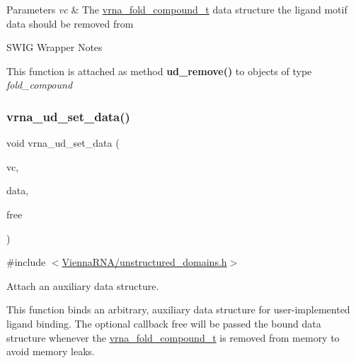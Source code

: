 \begin{DoxyParams}{Parameters}
{\em vc} & The \hyperlink{group__fold__compound_ga1b0cef17fd40466cef5968eaeeff6166}{vrna\+\_\+fold\+\_\+compound\+\_\+t} data structure the ligand motif data should be removed from\\
\hline
\end{DoxyParams}
\begin{DoxyRefDesc}{S\+W\+I\+G Wrapper Notes}
\item[\hyperlink{wrappers__wrappers000041}{S\+W\+I\+G Wrapper Notes}]This function is attached as method {\bfseries ud\+\_\+remove()} to objects of type {\itshape fold\+\_\+compound} \end{DoxyRefDesc}
\mbox{\label{group__domains__up_gac1f18c312b91d80089534a87d956e58b}} 
\subsubsection{\texorpdfstring{vrna\+\_\+ud\+\_\+set\+\_\+data()}{vrna\_ud\_set\_data()}}
{\footnotesize\ttfamily void vrna\+\_\+ud\+\_\+set\+\_\+data (\begin{DoxyParamCaption}\item[{\hyperlink{group__fold__compound_ga1b0cef17fd40466cef5968eaeeff6166}{vrna\+\_\+fold\+\_\+compound\+\_\+t} $\ast$}]{vc,  }\item[{void $\ast$}]{data,  }\item[{\hyperlink{group__fold__compound_ga7806651f51b195013839a218b3bbd5a3}{vrna\+\_\+callback\+\_\+free\+\_\+auxdata} $\ast$}]{free }\end{DoxyParamCaption})}



{\ttfamily \#include $<$\hyperlink{unstructured__domains_8h}{Vienna\+R\+N\+A/unstructured\+\_\+domains.\+h}$>$}



Attach an auxiliary data structure. 

This function binds an arbitrary, auxiliary data structure for user-\/implemented ligand binding. The optional callback {\ttfamily free} will be passed the bound data structure whenever the \hyperlink{group__fold__compound_ga1b0cef17fd40466cef5968eaeeff6166}{vrna\+\_\+fold\+\_\+compound\+\_\+t} is removed from memory to avoid memory leaks.

